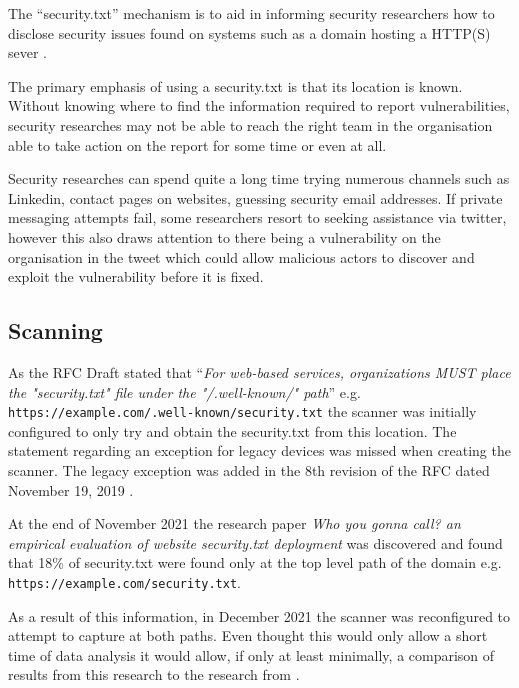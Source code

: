 \documentclass{mscreport}
\begin{document}
\noindent
The ``security.txt'' mechanism is to aid in informing security researchers how to disclose security issues found on systems such as a domain hosting a HTTP(S) sever \cite{Foudil2021-vh}.

\vspace{0.3cm} \noindent
The primary emphasis of using a security.txt is that its location is known. Without knowing where to find the information required to report vulnerabilities, security researches may not be able to reach the right team in the organisation able to take action on the report for some time or even at all.

\vspace{0.3cm} \noindent
Security researches can spend quite a long time trying numerous channels such as Linkedin, contact pages on websites, guessing security email addresses. If private messaging attempts fail, some researchers resort to seeking assistance via twitter, however this also draws attention to there being a vulnerability on the organisation in the tweet which could allow malicious actors to discover and exploit the vulnerability before it is fixed.

\subsection{Scanning}

\vspace{0.3cm} \noindent
As the RFC Draft stated that ``\textit{For web-based services, organizations MUST place the "security.txt" file under the "/.well-known/" path}'' \cite{Foudil2021-vh} e.g. \newline \texttt{https://example.com/.well-known/security.txt} the scanner was initially configured to only try and obtain the security.txt from this location. The statement regarding an exception for legacy devices was missed when creating the scanner. The legacy exception was added in the 8th revision of the RFC dated November 19, 2019 \cite{Foudil2021-vh}.

\vspace{0.3cm} \noindent
At the end of November 2021 the research paper \textit{Who you gonna call? an empirical evaluation of website security.txt deployment} \cite{Poteat2021-zr} was discovered and found that 18\% of security.txt were found only at the top level path of the domain e.g. \newline \texttt{https://example.com/security.txt}.

\vspace{0.3cm} \noindent
As a result of this information, in December 2021 the scanner was reconfigured to attempt to capture at both paths. Even thought this would only allow a short time of data analysis it would allow, if only at least minimally, a comparison of results from this research to the research from \cite{Poteat2021-zr}.
\end{document}
